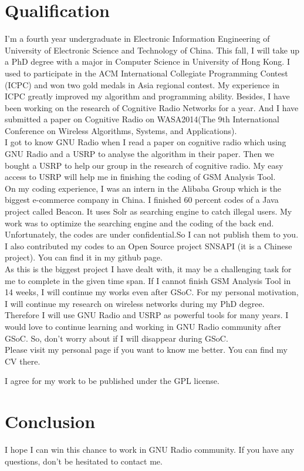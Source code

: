 \documentclass[a4paper,12pt,oneside]{article}
\begin{document}
\section{Qualification}
I'm a fourth year undergraduate in Electronic Information Engineering of University of Electronic Science and Technology of China. This fall, I will take up a PhD degree with a major in Computer Science in University of Hong Kong. I used to participate in the ACM International Collegiate Programming Contest (ICPC) and won two gold medals in Asia regional contest. My experience in ICPC greatly improved my algorithm and programming ability. Besides, I have been working on the research of Cognitive Radio Networks for a year. And I have submitted a paper on Cognitive Radio on WASA2014(The 9th International Conference on Wireless Algorithms, Systems, and Applications). \\

I got to know GNU Radio when I read a paper on cognitive radio which using GNU Radio and a USRP to analyse the algorithm in their paper. Then we bought a USRP to help our group in the research of cognitive radio. My easy access to USRP will help me in finishing the coding of GSM Analysis Tool.\\

On my coding experience, I was an intern in the Alibaba Group which is the biggest e-commerce company in China. I finished 60 percent codes of a Java project called Beacon. It uses Solr as searching engine to catch illegal users. My work was to optimize the searching engine and the coding of the back end. Unfortunately, the codes are under confidential.So I can not publish them to you. I also contributed my codes to an Open Source project SNSAPI (it is a Chinese project). You can find it in my github page\cite{snsapi}.\\

As this is the biggest project I have dealt with, it may be a challenging task for me to complete in the given time span. If I cannot finish GSM Analysis Tool in 14 weeks, I will continue my works even after GSoC. For my personal motivation, I will continue my research on wireless networks during my PhD degree. Therefore I will use GNU Radio and USRP as powerful tools for many years. I would love to continue learning and working in GNU Radio community after GSoC. So, don't worry about if I will disappear during GSoC.\\

Please visit my personal page\cite{personal} if you want to know me better. You can find my CV there.

I agree for my work to be published under the GPL license.

\section{Conclusion}
I hope I can win this chance to work in GNU Radio community. If you have any questions, don't be hesitated to contact me.

\end{document}
